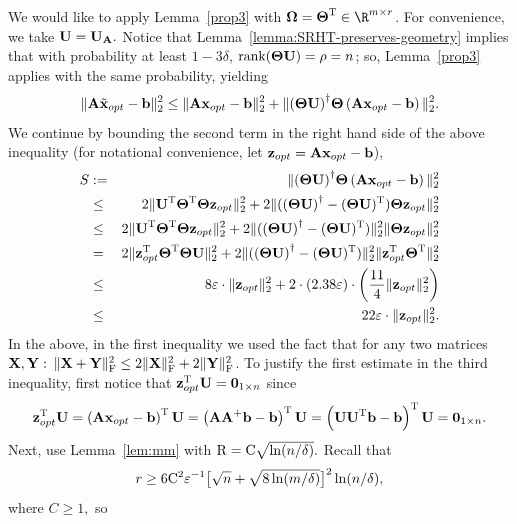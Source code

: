 We would like to apply Lemma~\ref{prop3} with $\matOmega = \matTh\transp \in \R^{m \times r}$. For convenience, we take $\matU = \matU_{\matA}.$
Notice that Lemma~\ref{lemma:SRHT-preserves-geometry} implies that with probability at least $1-3\delta$,
$\rank( \matTh \matU ) = \rho = n$; so, Lemma~\ref{prop3} applies with the same probability, yielding
\begin{equation}\label{eqn:regression}
\TNormS{ \matA \tilde{\x}_{opt} - \b  } \le \TNormS{ \matA \x_{opt} - \b  } + \TNormS{ \pinv{ \left( \matTh \matU \right) } \matTh  \left(\matA \x_{opt} - \b\right)  }.
\end{equation}
We continue by bounding the second term in the right hand side of the above inequality (for notational convenience, let $\z_{opt} = \matA \x_{opt}-\b$),
%
\begin{eqnarray*}
 S &:=& \TNormS{ \pinv{ \left( \matTh \matU \right) } \matTh  \left(\matA \x_{opt} - \b\right)  } \\
&\leq&  2\TNormS{\matU\transp \matTh\transp \matTh \z_{opt}} +
2\TNormS{( \pinv{( \matTh \matU)} - (\matTh \matU)\transp ) \matTh \z_{opt}} \\
&\leq& 2\TNormS{\matU\transp \matTh\transp \matTh \z_{opt}} +
2\TNormS{( \pinv{( \matTh \matU)} - (\matTh \matU)\transp )} \TNormS{ \matTh \z_{opt}} \\
& = & 2\TNormS{ \z_{opt}\transp \matTh\transp \matTh \matU } +
2\TNormS{( \pinv{( \matTh \matU)} - (\matTh \matU)\transp )} \TNormS{ \z_{opt}\transp \matTh\transp} \\
&\leq&
 8 \varepsilon \cdot \TNormS{\z_{opt}  }  +
2\cdot \left( 2.38 \varepsilon \right) \cdot \left( \frac{11}{4} \TNormS{\z_{opt}  } \right)  \\
&\leq&  22 \varepsilon \cdot \TNormS{\z_{opt}}.
\end{eqnarray*}
%
In the above, in the first inequality we used the fact that for any two matrices $\matX, \matY:$ $\FNormS{\matX+\matY} \le 2 \FNormS{\matX} + 2 \FNormS{\matY}$.
To justify the first estimate in the third inequality, first notice that $\z_{opt}\transp \matU =  {\bf 0}_{1 \times n}$ since
\[
\z_{opt}\transp \matU
= \left( \matA \x_{opt} - \b \right)\transp \matU
= \left( \matA \matA^+ \b - \b \right)\transp \matU
= \left( \matU \matU\transp \b - \b \right)\transp \matU
=  {\bf 0}_{1 \times n}.
\]
Next, use Lemma~\ref{lem:mm} with $\const{R} = \const{C} \sqrt{\ln(n/\delta)}.$ Recall that
$$r \geq 6 \const{C}^2 \varepsilon^{-1} \big[ \sqrt{n} + \sqrt{8 \ln(m/\delta)} \big]^2 \ln(n/\delta),$$ where $C \ge 1,$ so
